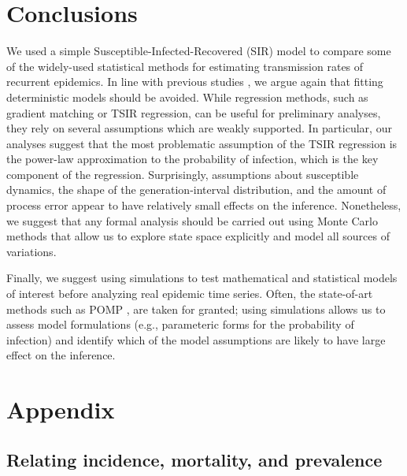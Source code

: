 \documentclass{article}
\begin{document}
\section{Conclusions}

We used a simple Susceptible-Infected-Recovered (SIR) model to compare some of the widely-used statistical methods for estimating transmission rates of recurrent epidemics.
In line with previous studies \citep{king2015avoidable, taylor2016stochasticity}, we argue again that fitting deterministic models should be avoided.
While regression methods, such as gradient matching or TSIR regression, can be useful for preliminary analyses, 
they rely on several assumptions which are weakly supported.
In particular, our analyses suggest that the most problematic assumption of the TSIR regression is the power-law approximation to the probability of infection, which is the key component of the regression.
Surprisingly, assumptions about susceptible dynamics, the shape of the generation-interval distribution, and the amount of process error appear to have relatively small effects on the inference.
Nonetheless, we suggest that any formal analysis should be carried out using Monte Carlo methods that allow us to explore state space explicitly and model all sources of variations.

Finally, we suggest using simulations to test mathematical and statistical models of interest before analyzing real epidemic time series.
Often, the state-of-art methods such as POMP \citep{king2015statistical}, are taken for granted;
using simulations allows us to assess model formulations (e.g., parameteric forms for the probability of infection) and identify which of the model assumptions are likely to have large effect on the inference.


\pagebreak

{} 


\pagebreak

\appendix
\renewcommand{\thesection}{\Alph{section}}
\renewcommand{\thesubsection}{A.\arabic{subsection}}
\renewcommand\thefigure{A.\arabic{subsection}}    
\section{Appendix}

\subsection{Relating incidence, mortality, and prevalence}
\end{document}
